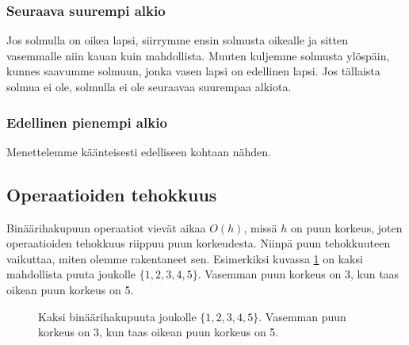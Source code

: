 \subsubsection{Seuraava suurempi alkio}

Jos solmulla on oikea lapsi, siirrymme ensin solmusta oikealle
ja sitten vasemmalle niin kauan kuin mahdollista.
Muuten kuljemme solmusta ylöspäin, kunnes saavumme solmuun,
jonka vasen lapsi on edellinen lapsi.
Jos tällaista solmua ei ole, solmulla ei ole seuraavaa
suurempaa alkiota.

\subsubsection{Edellinen pienempi alkio}

Menettelemme käänteisesti edelliseen kohtaan nähden.

\subsection{Operaatioiden tehokkuus}

Binäärihakupuun operaatiot vievät aikaa $O(h)$,
missä $h$ on puun korkeus, joten operaatioiden tehokkuus
riippuu puun korkeudesta.
Niinpä puun tehokkuuteen vaikuttaa, miten olemme
rakentaneet sen.
Esimerkiksi kuvassa \ref{fig:bihkor} on kaksi mahdollista puuta
joukolle $\{1,2,3,4,5\}$.
Vasemman puun korkeus on 3, kun taas oikean puun korkeus on 5.

\begin{figure}
\center
{}
\caption{Kaksi binäärihakupuuta joukolle $\{1,2,3,4,5\}$.
Vasemman puun korkeus on 3, kun taas oikean puun korkeus on 5.}
\label{fig:bihkor}
\end{figure}


